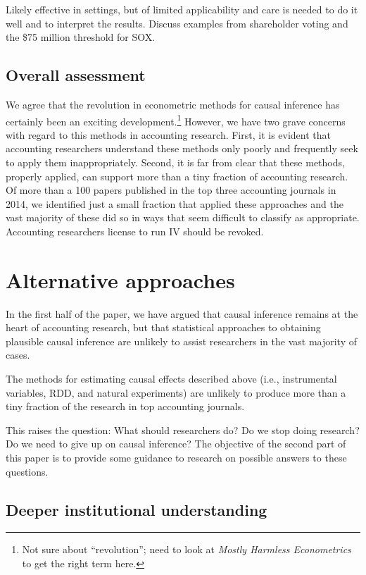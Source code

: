 \documentclass[11pt]{amsart}
\begin{document}
\newpage

Likely effective in settings, but of limited applicability and care is needed to do it well and to interpret the results. Discuss examples from shareholder voting and the \$75 million threshold for SOX.

\subsection{Overall assessment}

We agree that the revolution in econometric methods for causal inference has certainly been an exciting development.\footnote{Not sure about ``revolution''; need to look at \emph{Mostly Harmless Econometrics} to get the right term here.} However, we have two grave concerns with regard to this methods in accounting research. First, it is evident that accounting researchers understand these methods only poorly and frequently seek to apply them inappropriately. Second,  it is far from clear that these methods, properly applied, can support more than a tiny fraction of accounting research. Of more than a 100 papers published in the top three accounting journals in 2014, we identified just a small fraction that applied these approaches and the vast majority of these did so in ways that seem difficult to classify as appropriate. Accounting researchers license to run IV should be revoked.

\section{Alternative approaches}

In the first half of the paper, we have argued that causal inference remains at the heart of accounting research, but that statistical approaches to obtaining plausible causal inference are unlikely to assist researchers in the vast majority of cases.

The methods for estimating causal effects described above (i.e., instrumental variables, RDD, and natural experiments) are unlikely to produce more than a tiny fraction of the research in top accounting journals.

This raises the question: What should researchers do? Do we stop doing research? Do we need to give up on causal inference? The objective of the second part of this paper is to provide some guidance to research on possible answers to these questions.


\subsection{Deeper institutional understanding}
\end{document}
